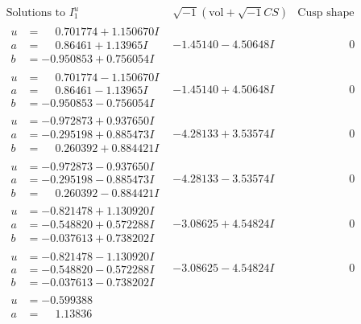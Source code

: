 \documentclass[1p]{elsarticle_modified}
\theoremstyle{definition}
\newcommand{\I}{\sqrt{-1}}
\begin{document}
$$\begin{array}{c|c|c}
\text{Solutions to }I^u_{1}& \I (\text{vol} + \sqrt{-1}CS) & \text{Cusp shape}\\
 \hline 
\begin{aligned}
u &= \phantom{-}0.701774 + 1.150670 I \\
a &= \phantom{-}0.86461 + 1.13965 I \\
b &= -0.950853 + 0.756054 I\end{aligned}
 & -1.45140 - 4.50648 I & \phantom{-0.000000 } 0 \\ \hline\begin{aligned}
u &= \phantom{-}0.701774 - 1.150670 I \\
a &= \phantom{-}0.86461 - 1.13965 I \\
b &= -0.950853 - 0.756054 I\end{aligned}
 & -1.45140 + 4.50648 I & \phantom{-0.000000 } 0 \\ \hline\begin{aligned}
u &= -0.972873 + 0.937650 I \\
a &= -0.295198 + 0.885473 I \\
b &= \phantom{-}0.260392 + 0.884421 I\end{aligned}
 & -4.28133 + 3.53574 I & \phantom{-0.000000 } 0 \\ \hline\begin{aligned}
u &= -0.972873 - 0.937650 I \\
a &= -0.295198 - 0.885473 I \\
b &= \phantom{-}0.260392 - 0.884421 I\end{aligned}
 & -4.28133 - 3.53574 I & \phantom{-0.000000 } 0 \\ \hline\begin{aligned}
u &= -0.821478 + 1.130920 I \\
a &= -0.548820 + 0.572288 I \\
b &= -0.037613 + 0.738202 I\end{aligned}
 & -3.08625 + 4.54824 I & \phantom{-0.000000 } 0 \\ \hline\begin{aligned}
u &= -0.821478 - 1.130920 I \\
a &= -0.548820 - 0.572288 I \\
b &= -0.037613 - 0.738202 I\end{aligned}
 & -3.08625 - 4.54824 I & \phantom{-0.000000 } 0 \\ \hline\begin{aligned}
u &= -0.599388\phantom{ +0.000000I} \\
a &= \phantom{-}1.13836\phantom{ +0.000000I} \\

\end{aligned}
\end{array}$$
\end{document}
